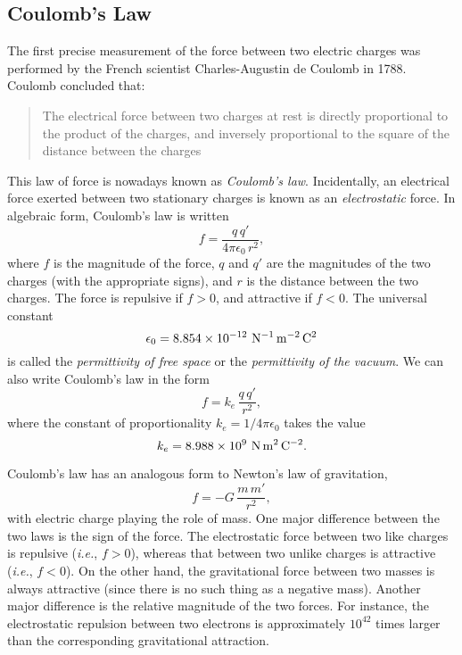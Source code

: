 \subsection{Coulomb's Law}
The first precise  measurement of the force between two electric charges was
performed by the French scientist Charles-Augustin de Coulomb in 1788. Coulomb concluded that: 
\begin{quote}{\sf The electrical force between two
charges at rest is directly proportional to the product of the charges, and
inversely proportional to the square of the distance between the charges}
\end{quote}
This law of force is nowadays known as {\em Coulomb's law}. 
Incidentally, an electrical force exerted between two stationary charges
is known as an {\em electrostatic}\/ force. 
In algebraic
form, Coulomb's law is written
\begin{equation}
f = \frac{q\,q'}{4\pi\epsilon_0\,r^2},
\end{equation}
where $f$ is the magnitude of the
force, $q$ and $q'$ are the magnitudes of the two charges
(with the appropriate signs), and $r$ is the distance between the two charges.
The force is repulsive if $f>0$, and attractive if $f<0$.
The universal constant
\begin{equation}
\epsilon_0 = 8.854\times 10^{-12}\,\,{\rm N^{-1}\, m^{-2}\,C^2}
\end{equation}
is called the {\em permittivity of free space} or the {\em permittivity
of the vacuum}. We can also write Coulomb's law in the form
\begin{equation}
f = k_e\, \frac{q \,q'}{r^2},
\end{equation}
where the constant of proportionality $k_e=1/4\pi\epsilon_0$ takes the value
\begin{equation}
k_e = 8.988\times 10^9\,\,{\rm N\,m^2\,C^{-2}}.
\end{equation}

Coulomb's law has an analogous form to Newton's law of gravitation, 
\begin{equation}
f = -G\,\frac{m\,m'}{r^2},
\end{equation}
with
electric charge playing the role of mass. One major difference
between the two laws is the sign of the force. 
The electrostatic force between two
like charges is repulsive ({\em i.e.}, $f>0$), whereas that between two
unlike charges is attractive ({\em i.e.}, $f<0$). On the other hand, the
gravitational force between two masses is always attractive (since there is
no such thing as a negative mass). Another major difference is the relative magnitude
of the two forces. For  instance, the electrostatic repulsion between two electrons is
approximately $10^{42}$ times larger than the corresponding
gravitational attraction. 

